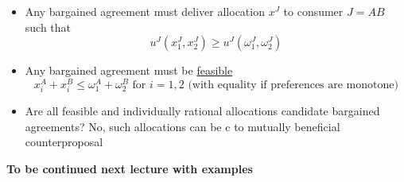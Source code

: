 \documentclass[twoside]{article}
\begin{document}
\begin{itemize}
\begin{itemize}
\begin{center}
\end{center}
\item Any bargained agreement must deliver allocation \(x^J\) to consumer \(J = AB\) such that 
\[u^J(x_1^J, x_2^J) \geq u^J(\omega^J_1, \omega^J_2)\]
\item Any bargained agreement must be \underline{feasible}
\[x_i^A + x_i^B \leq \omega^A_1 + \omega^B_2 \text{ for } i = 1,2  \text{ (with equality if preferences are monotone)} \]
\item Are all feasible and individually rational allocations candidate bargained agreements? No, such allocations can be c  to mutually beneficial counterproposal
\end{itemize}
\end{itemize}
\begin{center}
\textbf{To be continued next lecture with examples}
\end{center}
\end{document}
